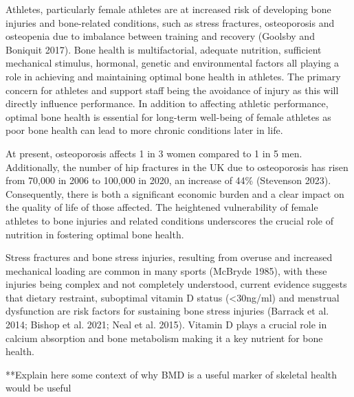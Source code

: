 \documentclass[
]{article}
\begin{document}
Athletes, particularly female athletes are at increased risk of developing bone injuries and bone-related conditions, such as stress fractures, osteoporosis and osteopenia due to imbalance between training and recovery (Goolsby and Boniquit 2017). Bone health is multifactorial, adequate nutrition, sufficient mechanical stimulus, hormonal, genetic and environmental factors all playing a role in achieving and maintaining optimal bone health in athletes. The primary concern for athletes and support staff being the avoidance of injury as this will directly influence performance. In addition to affecting athletic performance, optimal bone health is essential for long-term well-being of female athletes as poor bone health can lead to more chronic conditions later in life.

At present, osteoporosis affects 1 in 3 women compared to 1 in 5 men. Additionally, the number of hip fractures in the UK due to osteoporosis has risen from 70,000 in 2006 to 100,000 in 2020, an increase of 44\% (Stevenson 2023). Consequently, there is both a significant economic burden and a clear impact on the quality of life of those affected. The heightened vulnerability of female athletes to bone injuries and related conditions underscores the crucial role of nutrition in fostering optimal bone health.

Stress fractures and bone stress injuries, resulting from overuse and increased mechanical loading are common in many sports (McBryde 1985), with these injuries being complex and not completely understood, current evidence suggests that dietary restraint, suboptimal vitamin D status (\textless30ng/ml) and menstrual dysfunction are risk factors for sustaining bone stress injuries (Barrack et al. 2014; Bishop et al. 2021; Neal et al. 2015). Vitamin D plays a crucial role in calcium absorption and bone metabolism making it a key nutrient for bone health.

**Explain here some context of why BMD is a useful marker of skeletal health would be useful
\end{document}

